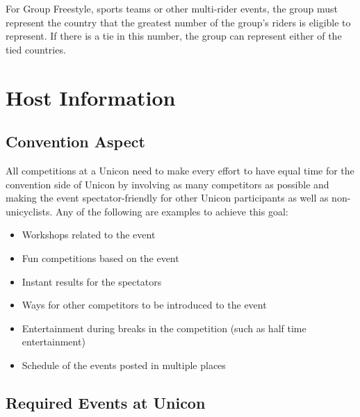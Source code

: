 For Group Freestyle, sports teams or other multi-rider events, the group must represent the country that the greatest number of the group's riders is eligible to represent.
If there is a tie in this number, the group can represent either of the tied countries.

\chapter{Host Information}

\section{Convention Aspect}

All competitions at a Unicon need to make every effort to have equal time for the convention side of Unicon by involving as many competitors as possible and making the event spectator-friendly for other Unicon participants as well as non-unicyclists.
Any of the following are examples to achieve this goal:
\begin{itemize}
  \item Workshops related to the event
  \item Fun competitions based on the event
  \item Instant results for the spectators
  \item Ways for other competitors to be introduced to the event
  \item Entertainment during breaks in the competition (such as half time entertainment)
  \item Schedule of the events posted in multiple places
\end{itemize}

\section{Required Events at Unicon}%


